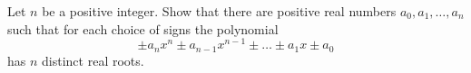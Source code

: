 \documentclass{article}
\begin{document}
\setlength{\parindent}{0pt}
Let $n$ be a positive integer. Show that there are positive real numbers $a_0, a_1, \dots, a_n$ such that for each choice of signs the polynomial
\[\pm a_nx^n \pm a_{n-1}x^{n-1} \pm \dots \pm a_1x \pm a_0\]
has $n$ distinct real roots.
\end{document}

